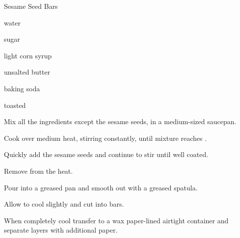 \begin{recipe}{Sesame Seed Bars}{}{}

\begin{ingredients}
\item {} water
\item {} sugar
\item {} light corn syrup
\item {} unsalted butter
\item \tp{\quarter} baking soda
\item {} toasted 
\end{ingredients}

\begin{directions}
\item Mix all the ingredients except the sesame seeds, in a medium-sized saucepan.
\item Cook over medium heat, stirring constantly, until mixture reaches .
\item Quickly add the sesame seeds and continue to stir until well coated.
\item Remove from the heat.
\item Pour into a greased pan and smooth out with a greased spatula.
\item Allow to cool slightly and cut into bars.
\item When completely cool transfer to a wax paper-lined airtight container and separate layers with additional paper.
\end{directions}
\end{recipe}
